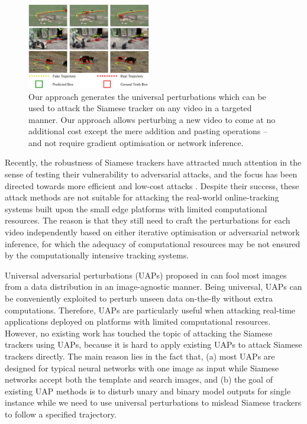 \documentclass{article}
\begin{document}
\begin{figure}[htbp]
\centering
\includegraphics[width=0.48\textwidth]{images/1_v4.pdf}
\caption{Our approach generates the universal perturbations which can be used to attack the Siamese tracker on any video in a targeted manner. Our approach allows perturbing a new video to come at no additional cost except the mere addition and pasting operations -- and not require gradient optimisation or network inference.}
\label{fig:1}
\end{figure}

Recently, the robustness of Siamese trackers have attracted much attention in the sense of testing their vulnerability to adversarial attacks, and the focus has been directed towards more efficient and low-cost attacks \cite{TTP,FAN,SPARK}. Despite their success, these attack methods are not suitable for attacking the real-world online-tracking systems built upon the small edge platforms with limited computational resources. The reason is that they still need to craft the perturbations for each video independently based on either iterative optimisation or adversarial network inference, for which the adequacy of computational resources may be not ensured by the computationally intensive tracking systems. 

Universal adversarial perturbations (UAPs) proposed in \cite{UAP} can fool most images from a data distribution in an image-agnostic manner. Being universal, UAPs can be conveniently exploited to perturb unseen data on-the-fly without extra computations. Therefore, UAPs are particularly useful when attacking real-time applications deployed on platforms with limited computational resources. However, no existing work has touched the topic of attacking the Siamese trackers using UAPs, because it is hard to apply existing UAPs to attack Siamese trackers directly. The main reason lies in the fact that, (a) most UAPs are designed for typical neural networks with one image as input while Siamese networks accept both the template and search images, and (b) the goal of existing UAP methods is to disturb unary and binary model outputs for single instance while we need to use universal perturbations to mislead Siamese trackers to follow a specified trajectory.
\end{document}
